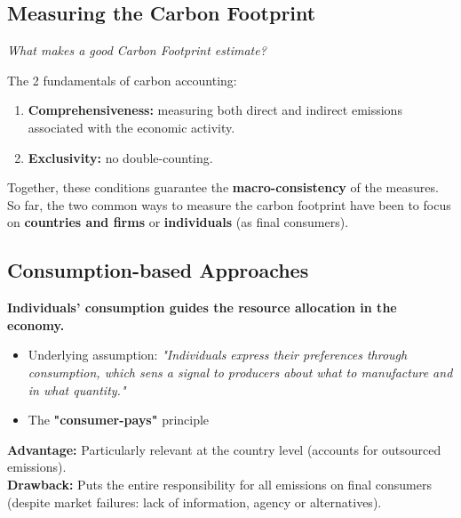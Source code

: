 \documentclass[10pt]{beamer}
\begin{document}
\subsection{Measuring the Carbon Footprint}
\begin{frame}{\subsecname}

    \textit{What makes a good Carbon Footprint estimate?}
    
    The 2 fundamentals of carbon accounting:
        \begin{enumerate}
            \item \textbf{Comprehensiveness:} measuring both direct and indirect emissions associated with the economic activity.
            \item \textbf{Exclusivity:} no double-counting.
        \end{enumerate}
    
    Together, these conditions guarantee the \textbf{macro-consistency} of the measures. \\
    So far, the two common ways to measure the carbon footprint have been to focus on \textbf{countries and firms} or \textbf{individuals} (as final consumers).
\end{frame}

\subsection{Consumption-based Approaches}
\begin{frame}{\subsecname}
    \textbf{Individuals' consumption guides the resource allocation in the economy.}
        \begin{itemize}
            \item Underlying assumption: \textit{"Individuals express their preferences through consumption, which sens a signal to producers about what to manufacture and in what quantity."}
            \item The \textbf{"consumer-pays"} principle
        \end{itemize}
        \textbf{Advantage:} Particularly relevant at the country level (accounts for outsourced emissions). \\
        \textbf{Drawback:} Puts the entire responsibility for all emissions on final consumers (despite market failures: lack of information, agency or alternatives).
\end{frame}
\end{document}
